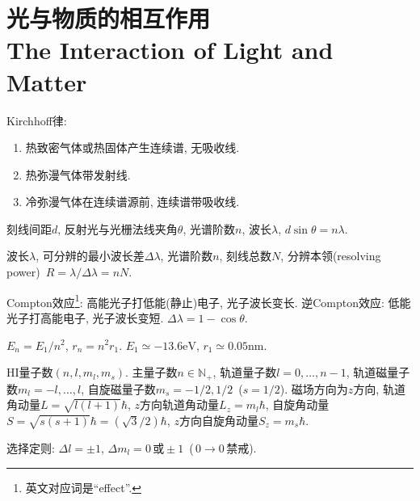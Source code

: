 \chapter{光与物质的相互作用\\The Interaction of Light and Matter}

Kirchhoff律:
\begin{enumerate}
    \item 热致密气体或热固体产生连续谱, 无吸收线.
    \item 热弥漫气体带发射线.
    \item 冷弥漫气体在连续谱源前, 连续谱带吸收线.
\end{enumerate}

刻线间距$d$, 反射光与光栅法线夹角$\theta$, 光谱阶数$n$, 波长$\lambda$, $d\sin\theta=n\lambda$.

波长$\lambda$, 可分辨的最小波长差$\Delta\lambda$, 光谱阶数$n$, 刻线总数$N$, 分辨本领(resolving power)~$R=\lambda/\Delta\lambda=nN$.

Compton效应\footnote{英文对应词是``effect''.}: 高能光子打低能(静止)电子, 光子波长变长. 逆Compton效应: 低能光子打高能电子, 光子波长变短. $\Delta\lambda=1-\cos\theta$.

$E_n=E_1/n^2$, $r_n=n^2r_1$. $E_1\simeq-13.6\text{eV}$, $r_1\simeq0.05\text{nm}$.

HI量子数$(n,l,m_l,m_s)$. 主量子数$n\in\mathbb{N}_+$, 轨道量子数$l=0,\dots,n-1$, 轨道磁量子数$m_l=-l,\dots,l$, 自旋磁量子数$m_s=-1/2,1/2$~($s=1/2$). 磁场方向为$z$方向, 轨道角动量$L=\sqrt{l(l+1)}\hbar$, $z$方向轨道角动量$L_z=m_l\hbar$, 自旋角动量$S=\sqrt{s(s+1)}\hbar=(\sqrt{3}/2)\hbar$, $z$方向自旋角动量$S_z=m_s\hbar$.

选择定则: $\Delta l=\pm1$, $\Delta m_l=0\,\text{或}\pm1$~($\,0\to0\,\text{禁戒}$).
